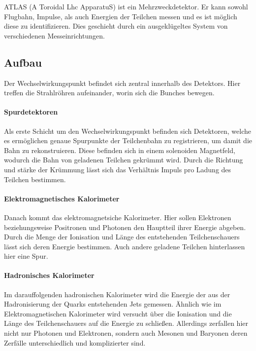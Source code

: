 \documentclass[
a4paper,                                %
twoside,                                %
BCOR1.4cm,                      %
ngerman,                                %
10pt,                           %
headings=normal,                %
headsepline,                    %
clearplainpage, %
final,                                  %
div=14,
parskip=full
]{scrbook}
\begin{document}
ATLAS (A Toroidal Lhc ApparatuS) ist ein Mehrzweckdetektor. Er kann sowohl Flugbahn, Impulse, als auch Energien der Teilchen messen und es ist m\"oglich diese zu identifizieren. Dies geschieht durch ein ausgekl\"ugeltes System von verschiedenen Messeinrichtungen.

\subsection{Aufbau}

Der Wechselwirkungspunkt befindet sich zentral innerhalb des Detektors. Hier treffen die Strahlr\"ohren aufeinander, worin sich die Bunches bewegen.

\paragraph*{Spurdetektoren}

Als erste Schicht um den Wechselwirkungspunkt befinden sich Detektoren, welche es erm\"oglichen genaue Spurpunkte der Teilchenbahn zu registrieren, um damit die Bahn zu rekonstruieren. Diese befinden sich in einem solenoiden Magnetfeld, wodurch die Bahn von geladenen Teilchen gekr\"ummt wird. Durch die Richtung und st\"arke der Kr\"ummung l\"asst sich das Verh\"altnis Impuls pro Ladung des Teilchen bestimmen. 

\paragraph*{Elektromagnetisches Kalorimeter}

Danach kommt das elektromagnetsiche Kalorimeter. Hier sollen Elektronen beziehungsweise Positronen und Photonen den Hauptteil ihrer Energie abgeben. Durch die Menge der Ionisation und L\"ange des entstehenden Teilchenschauers l\"asst sich deren Energie bestimmen. Auch andere geladene Teilchen hinterlassen hier eine Spur.

\paragraph*{Hadronisches Kalorimeter}

Im darauffolgenden hadronischen Kalorimeter wird die Energie der aus der Hadronisierung der Quarks entstehenden Jets gemessen. \"Ahnlich wie im Elektromagnetischen Kalorimeter wird versucht \"uber die Ionisation und die L\"ange des Teilchenschauers auf die Energie zu schlie\ss en. Allerdings zerfallen hier nicht nur Photonen und Elektronen, sondern auch Mesonen und Baryonen deren Zerf\"alle unterschiedlich und komplizierter sind.
\end{document}
